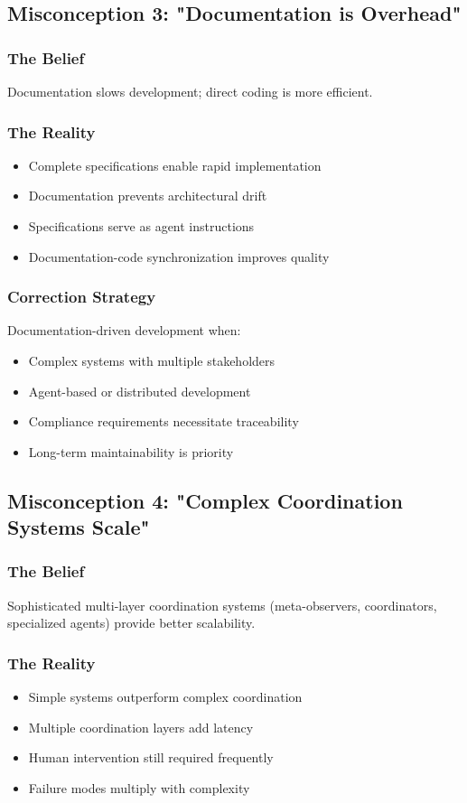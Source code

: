 \documentclass[11pt]{article}
\begin{document}
\subsection{Misconception 3: "Documentation is Overhead"}
\label{sec:orge03632e}
\subsubsection{The Belief}
\label{sec:org2b7b407}
Documentation slows development; direct coding is more efficient.
\subsubsection{The Reality}
\label{sec:org49a40b4}
\begin{itemize}
\item Complete specifications enable rapid implementation
\item Documentation prevents architectural drift
\item Specifications serve as agent instructions
\item Documentation-code synchronization improves quality
\end{itemize}
\subsubsection{Correction Strategy}
\label{sec:orgb6fc0a3}
Documentation-driven development when:
\begin{itemize}
\item Complex systems with multiple stakeholders
\item Agent-based or distributed development
\item Compliance requirements necessitate traceability
\item Long-term maintainability is priority
\end{itemize}
\subsection{Misconception 4: "Complex Coordination Systems Scale"}
\label{sec:org0791402}
\subsubsection{The Belief}
\label{sec:org7de36ff}
Sophisticated multi-layer coordination systems (meta-observers, coordinators, specialized agents) provide better scalability.
\subsubsection{The Reality}
\label{sec:orgcd9e524}
\begin{itemize}
\item Simple systems outperform complex coordination
\item Multiple coordination layers add latency
\item Human intervention still required frequently
\item Failure modes multiply with complexity
\end{itemize}
\end{document}
